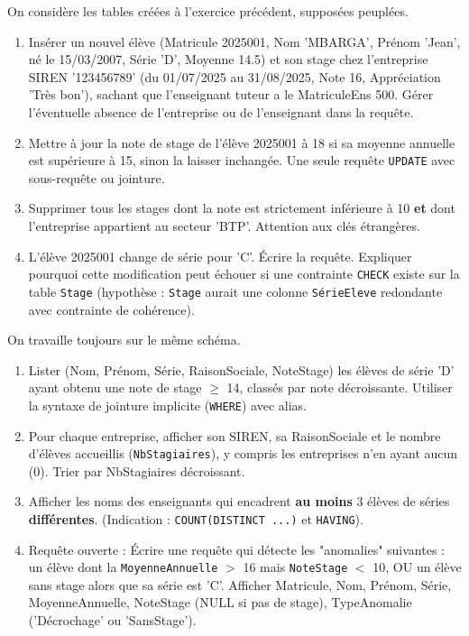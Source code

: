 \documentclass[11pt]{article}
\begin{document}
\begin{exercice}
On considère les tables créées à l'exercice précédent, supposées peuplées.
\begin{enumerate}
    \item Insérer un nouvel élève (Matricule 2025001, Nom 'MBARGA', Prénom 'Jean', né le 15/03/2007, Série 'D', Moyenne 14.5) et son stage chez l'entreprise SIREN '123456789' (du 01/07/2025 au 31/08/2025, Note 16, Appréciation 'Très bon'), sachant que l'enseignant tuteur a le MatriculeEns 500. Gérer l'éventuelle absence de l'entreprise ou de l'enseignant dans la requête.
    \item Mettre à jour la note de stage de l'élève 2025001 à 18 si sa moyenne annuelle est supérieure à 15, sinon la laisser inchangée. Une seule requête \texttt{UPDATE} avec sous-requête ou jointure.
    \item Supprimer tous les stages dont la note est strictement inférieure à 10 \textbf{et} dont l'entreprise appartient au secteur 'BTP'. Attention aux clés étrangères.
    \item L'élève 2025001 change de série pour 'C'. Écrire la requête. Expliquer pourquoi cette modification peut échouer si une contrainte \texttt{CHECK} existe sur la table \texttt{Stage} (hypothèse : \texttt{Stage} aurait une colonne \texttt{SérieEleve} redondante avec contrainte de cohérence).
\end{enumerate}
\end{exercice}

\begin{exercice}
On travaille toujours sur le même schéma.
\begin{enumerate}
    \item Lister (Nom, Prénom, Série, RaisonSociale, NoteStage) les élèves de série 'D' ayant obtenu une note de stage $\geq$ 14, classés par note décroissante. Utiliser la syntaxe de jointure implicite (\texttt{WHERE}) avec alias.
    \item Pour chaque entreprise, afficher son SIREN, sa RaisonSociale et le nombre d'élèves accueillis (\texttt{NbStagiaires}), y compris les entreprises n'en ayant aucun (0). Trier par NbStagiaires décroissant.
    \item Afficher les noms des enseignants qui encadrent \textbf{au moins} 3 élèves de séries \textbf{différentes}. (Indication : \texttt{COUNT(DISTINCT ...)} et \texttt{HAVING}).
    \item Requête ouverte : Écrire une requête qui détecte les "anomalies" suivantes : un élève dont la \texttt{MoyenneAnnuelle} $>$ 16 mais \texttt{NoteStage} $<$ 10, OU un élève sans stage alors que sa série est 'C'. Afficher Matricule, Nom, Prénom, Série, MoyenneAnnuelle, NoteStage (NULL si pas de stage), TypeAnomalie ('Décrochage' ou 'SansStage').
\end{enumerate}
\end{exercice}
\end{document}
